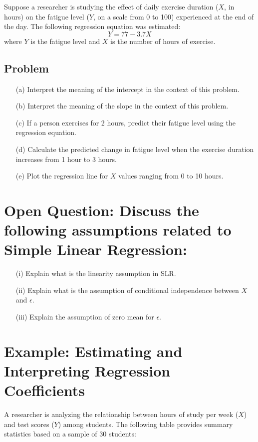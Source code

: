 \documentclass[11pt]{article}
\begin{document}
Suppose a researcher is studying the effect of daily exercise duration (\(X\), in hours) on the fatigue level (\(Y\), on a scale from 0 to 100) experienced at the end of the day. The following regression equation was estimated:
\[
Y = 77 - 3.7X
\]
where \(Y\) is the fatigue level and \(X\) is the number of hours of exercise.

\subsection*{Problem}

\begin{itemize}
    \item[(a)] Interpret the meaning of the intercept in the context of this problem.
    \item[(b)] Interpret the meaning of the slope in the context of this problem.
    \item[(c)] If a person exercises for 2 hours, predict their fatigue level using the regression equation.
    \item[(d)] Calculate the predicted change in fatigue level when the exercise duration increases from 1 hour to 3 hours.
    \item[(e)] Plot the regression line for \(X\) values ranging from 0 to 10 hours.
\end{itemize}

\section{Open Question: Discuss the following assumptions related to Simple Linear Regression:}
        \begin{itemize}
            \item[(i)] Explain what is the linearity assumption in SLR.
            \item[(ii)] Explain what is the assumption of conditional independence between \(X\) and \(\epsilon\).
            \item[(iii)] Explain the assumption of zero mean for \(\epsilon\).
        \end{itemize}

\section{Example: Estimating and Interpreting Regression Coefficients}

A researcher is analyzing the relationship between hours of study per week (\(X\)) and test scores (\(Y\)) among students. The following table provides summary statistics based on a sample of 30 students:
\end{document}
